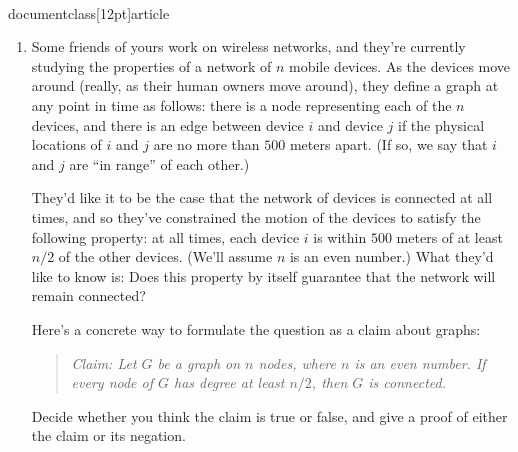 \\documentclass[12pt]{article}
\begin{document}
\begin{enumerate}


\item 

Some friends of yours work on wireless networks,
and they're currently studying the properties of a
network of $n$ mobile devices.
As the devices move around (really, as their human owners move around),
they define a graph at any point in time as follows:
there is a node representing each of the $n$ devices, and
there is an edge between device $i$ and device $j$
if the physical locations of $i$ and $j$
are no more than $500$ meters apart.
(If so, we say that $i$ and $j$ are ``in range'' of each other.)

They'd like it to be the case that the network of devices
is connected at all times, and so they've constrained
the motion of the devices to satisfy the following property:
at all times, each device $i$ is within $500$ meters of at
least $n/2$ of the other devices.
(We'll assume $n$ is an even number.)
What they'd like to know is: Does this property by itself
guarantee that the network will remain connected?

Here's a concrete way to formulate the question as
a claim about graphs:
\begin{quote}
{\em Claim: Let $G$ be a graph on $n$ nodes, where $n$
is an even number.  If every node of $G$ has degree at least $n/2$,
then $G$ is connected.}
\end{quote}
Decide whether you think the claim is true or false,
and give a proof of either the claim or its negation.


\end{enumerate}
\end{document}
